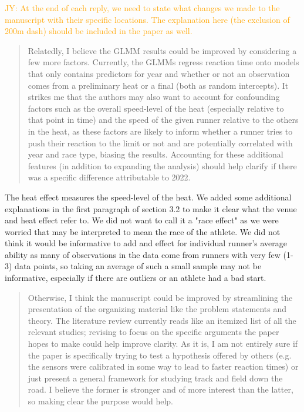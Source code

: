 \documentclass[12pt]{article}
\newcommand{\jy}[1]{\textcolor{orange}{JY: #1}}
\newenvironment{comment}%
{\begin{quotation}\noindent\small\it\color{darkblue}\ignorespaces%
}{\end{quotation}}
\begin{document}
\jy{At the end of each reply, we need to state what changes we made to
  the manuscript with their specific locations. The explanation here
  (the exclusion of 200m dash) should be included in the paper as well.}

\begin{comment}
Relatedly, I believe the GLMM results could be improved by considering a few
more factors. Currently, the GLMMs regress reaction time onto models that only
contains predictors for year and whether or not an observation comes from a
preliminary heat or a final (both as random intercepts). It strikes me that the
authors may also want to account for confounding factors such as the overall
speed-level of the heat (especially relative to that point in time) and the
speed of the given runner relative to the others in the heat, as these factors
are likely to inform whether a runner tries to push their reaction to the limit
or not and are potentially correlated with year and race type, biasing the
results. Accounting for these additional features (in addition to expanding the
analysis) should help clarify if there was a specific difference attributable to
2022.
\end{comment} 


The heat effect measures the speed-level of the heat.  We added some additional
explanations in the first paragraph of section 3.2 to make it clear what the
venue and heat effect refer to. We did not want to call it a "race effect" as we
were worried that may be interpreted to mean the race of the athlete.  We did
not think it would be informative to  add and effect for individual runner's
average ability as many of observations in the data come from runners
with very few (1-3) data points, so taking an average of such a small sample may
not be informative, especially if there are outliers or an athlete had a bad
start.


\begin{comment}
Otherwise, I think the manuscript could be improved by streamlining the
presentation of the organizing material like the problem statements and theory.
The literature review currently reads like an itemized list of all the relevant
studies; revising to focus on the specific arguments the paper hopes to make
could help improve clarity. As it is, I am not entirely sure if the paper is
specifically trying to test a hypothesis offered by others (e.g. the sensors
were calibrated in some way to lead to faster reaction times) or just present a
general framework for studying track and field down the road. I believe the
former is stronger and of more interest than the latter, so making clear the
purpose would help.
\end{comment}  
\end{document}
